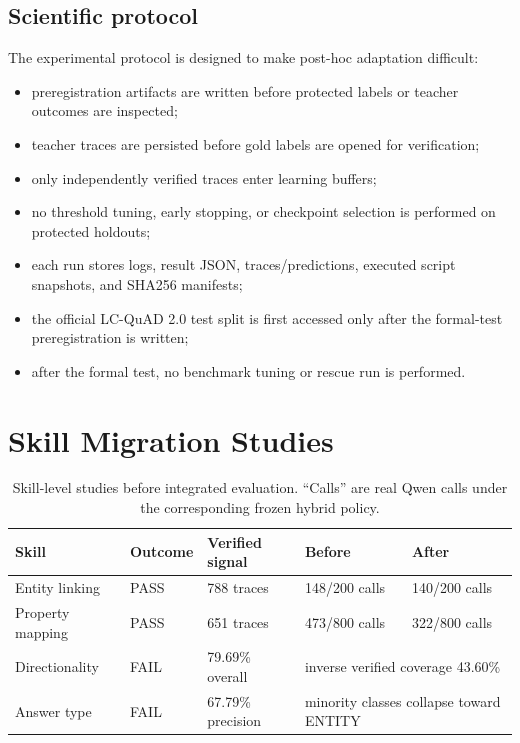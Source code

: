 \documentclass[10pt]{article}
\begin{document}
\subsection{Scientific protocol}
The experimental protocol is designed to make post-hoc adaptation difficult:
\begin{itemize}[leftmargin=*]
    \item preregistration artifacts are written before protected labels or teacher outcomes are inspected;
    \item teacher traces are persisted before gold labels are opened for verification;
    \item only independently verified traces enter learning buffers;
    \item no threshold tuning, early stopping, or checkpoint selection is performed on protected holdouts;
    \item each run stores logs, result JSON, traces/predictions, executed script snapshots, and SHA256 manifests;
    \item the official LC-QuAD 2.0 test split is first accessed only after the formal-test preregistration is written;
    \item after the formal test, no benchmark tuning or rescue run is performed.
\end{itemize}

\section{Skill Migration Studies}

\begin{table}[t]
\centering
\caption{Skill-level studies before integrated evaluation. ``Calls'' are real Qwen calls under the corresponding frozen hybrid policy.}
\label{tab:skills}
\small
\begin{tabular}{lllll}
\toprule
Skill & Outcome & Verified signal & Before & After \\
\midrule
Entity linking & PASS & 788 traces & 148/200 calls & 140/200 calls \\
Property mapping & PASS & 651 traces & 473/800 calls & 322/800 calls \\
Directionality & FAIL & 79.69\% overall & \multicolumn{2}{l}{inverse verified coverage 43.60\%} \\
Answer type & FAIL & 67.79\% precision & \multicolumn{2}{l}{minority classes collapse toward ENTITY} \\
\bottomrule
\end{tabular}
\end{table}
\end{document}
